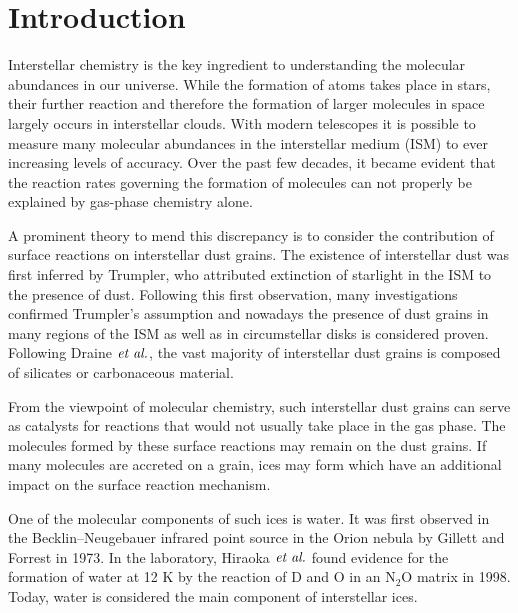 \tableofcontents
\cleardoublepage



    \maketitle
\section{Introduction}
\label{Sec:Intro}
Interstellar chemistry is the key ingredient to understanding the
molecular abundances in our universe. While
the formation of atoms takes place in stars, %
their further reaction and therefore the formation of larger molecules in
space largely occurs in interstellar clouds. With modern telescopes it is
possible to measure many molecular abundances in the interstellar medium (ISM)
to ever increasing levels of accuracy. Over the past few decades, it became
evident that the reaction rates governing the formation of molecules can not
properly be explained by gas-phase chemistry
alone.\cite{DishoeckHerbstNeufeld2013}

A prominent theory to mend this discrepancy is to consider the
contribution of surface reactions on interstellar dust
grains.\cite{WilliamsHerbst2002} The existence of interstellar dust was first
inferred by Trumpler, who attributed extinction of starlight in the ISM to the
presence of dust.\cite{Trumpler1930} Following this first observation, many
investigations confirmed Trumpler's assumption and nowadays the presence of
dust grains in many regions of the ISM as well as in circumstellar disks is
considered proven.
\cite{Zook2001,WestphalStroudBechtelEtAl2014} Following Draine $\emph{et al.}$,
the vast majority of interstellar dust grains is composed of silicates or
carbonaceous material. \cite{Draine2003}

From the viewpoint of molecular chemistry, such interstellar dust grains can
serve as catalysts for reactions that would not usually take place in the
gas phase. The molecules formed by these surface reactions may remain on the
dust grains. If many molecules are accreted on a grain, ices may form which have
an additional impact on the surface reaction mechanism.

One of the molecular components of such ices is water. It was first observed
in the Becklin--Neugebauer infrared point source in the Orion
nebula by Gillett and Forrest in 1973.
\cite{BecklinNeugebauer1967,GillettForrest1973} In the laboratory, Hiraoka
$\emph{et al.}$ found evidence for the formation of water at 12 K by the reaction of D and O in an N$_2$O
matrix in 1998.\cite{Hiraoka1998} Today, water is considered the main component
of interstellar ices. \cite{BoogertGerakinesWhittet2015} 

